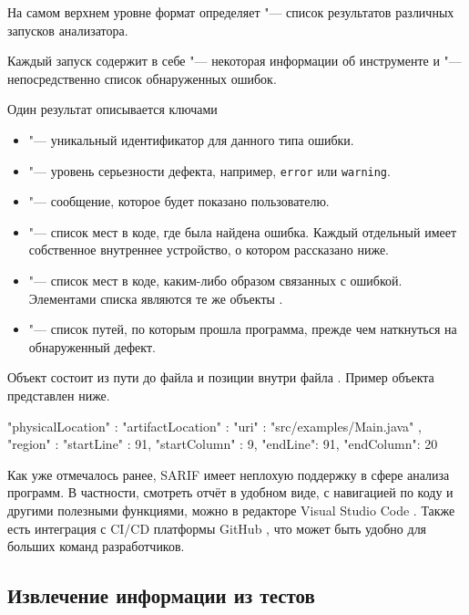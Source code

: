 На самом верхнем уровне формат определяет  "--- список результатов различных запусков анализатора.

Каждый запуск содержит в себе  "--- некоторая информации об инструменте и  "--- непосредственно список обнаруженных ошибок.

Один результат описывается ключами 

\begin{itemize}
    \item {} "--- уникальный идентификатор для данного типа ошибки.
    \item {} "--- уровень серьезности дефекта, например, \verb|error| или \verb|warning|.
    \item {} "--- сообщение, которое будет показано пользователю.
    \item {} "--- список мест в коде, где была найдена ошибка. Каждый отдельный  имеет собственное внутреннее устройство, о котором рассказано ниже.
    \item {} "--- список мест в коде, каким-либо образом связанных с ошибкой. Элементами списка являются те же объекты .
    \item {} "--- список путей, по которым прошла программа, прежде чем наткнуться на обнаруженный дефект.
\end{itemize}

Объект  состоит из пути до файла  и позиции внутри файла . Пример объекта  представлен ниже.

\begin{zerocode}
"physicalLocation" : {
  "artifactLocation" : {
    "uri" : "src/examples/Main.java"
  },
  "region" : {
    "startLine" : 91,
    "startColumn" : 9,
    "endLine": 91,
    "endColumn": 20
  }
}
\end{zerocode}

Как уже отмечалось ранее, SARIF имеет неплохую поддержку в сфере анализа программ. В частности, смотреть отчёт в удобном виде, с навигацией по коду и другими полезными функциями, можно в редакторе Visual Studio Code \cite{vscode}. Также есть интеграция с CI/CD платформы GitHub \cite{sarif-git}, что может быть удобно для больших команд разработчиков.

\subsection{Извлечение информации из тестов}

